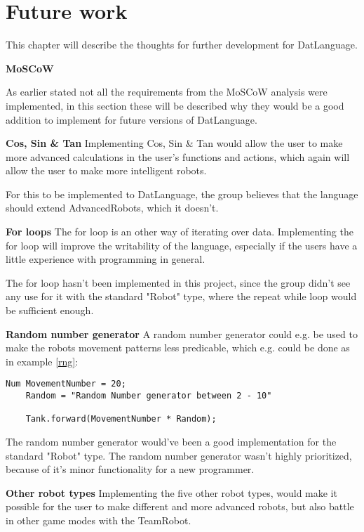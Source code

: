 \chapter{Future work}
This chapter will describe the thoughts for further development for DatLanguage. \newline

\textbf{\LARGE{MoSCoW}}

As earlier stated not all the requirements from the MoSCoW analysis were implemented, in this section these will be described why they would be a good addition to implement for future versions of DatLanguage.

\textbf{Cos, Sin \& Tan}\newline
Implementing Cos, Sin \& Tan would allow the user to make more advanced calculations in the user's functions and actions, which again will allow the user to make more intelligent robots. 

For this to be implemented to DatLanguage, the group believes that the language should extend AdvancedRobots, which it doesn't. 

\textbf{For loops} \newline
The for loop is an other way of iterating over data. Implementing the for loop will improve the writability of the language, especially if the users have a little experience with programming in general.

The for loop hasn't been implemented in this project, since the group didn't see any use for it with the standard "Robot" type, where the repeat while loop would be sufficient enough. 

\textbf{Random number generator}\newline
A random number generator could e.g. be used to make  the robots movement patterns less predicable, which e.g. could be done as in example \ref{rng}: 

\begin{lstlisting}[caption={Simple example of a random number generator}, label={rng}]
	Num MovementNumber = 20;
	Random = "Random Number generator between 2 - 10"
	
	Tank.forward(MovementNumber * Random);
\end{lstlisting}

The random number generator would've been a good implementation for the standard "Robot" type. The random number generator wasn't highly prioritized, because of it's minor functionality for a new programmer.

\textbf{Other robot types}\newline
Implementing the five other robot types, would make it possible for the user to make different and more advanced robots, but also battle in other game modes with the TeamRobot.

